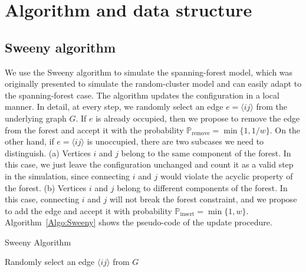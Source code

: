 \chapter{Algorithm and data structure}\label{chap:Algo}

\section{Sweeny algorithm}
We use the Sweeny algorithm\cite{Sweeny1983} to simulate the spanning-forest model, which was originally presented
to simulate the random-cluster model and can easily adapt to the spanning-forest case. The algorithm updates
the configuration in a local manner. In detail, at every step, we randomly select an edge $e = \langle i j \rangle$ from the underlying graph $G$. 
If $e$ is already occupied, then we propose to remove the edge from the forest and accept it with the probability
$\mathbb{P}_{\text{remove}} = \min\{1, 1/w\}$. On the other hand, if $e = \langle i j \rangle$ is unoccupied, there are two subcases we need to 
distinguish. (a) Vertices $i$ and $j$ belong to the same component of the forest. In this case, we just leave the
configuration unchanged and count it as a valid step in the simulation, since connecting $i$ and $j$ would violate the
acyclic property of the forest. (b) Vertices $i$ and $j$ belong to different components of the forest. In this case, connecting
$i$ and $j$ will not break the forest constraint, and we propose to add the edge and accept it with probability $\mathbb{P}_{\text{insert}} = \min\{1, w\}$. 
Algorithm~\ref{Algo:Sweeny} shows the pseudo-code of the update procedure.

\begin{algorithm}
\caption{Sweeny Algorithm} \label{Algo:Sweeny}
    Randomly select an edge $\langle ij \rangle$ from $G$\;
\end{algorithm}

